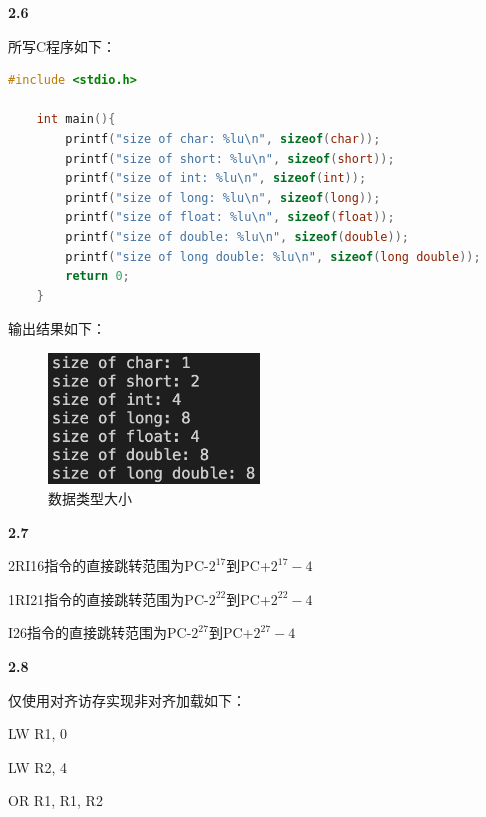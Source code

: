 \documentclass[UTF8]{article}
\newcommand{\tbf}[1]{\textbf{#1}}
\begin{document}
\tbf{2.6}

所写C程序如下：

\begin{lstlisting}[language=C]
    #include <stdio.h>

    int main(){
        printf("size of char: %lu\n", sizeof(char));
        printf("size of short: %lu\n", sizeof(short));
        printf("size of int: %lu\n", sizeof(int));
        printf("size of long: %lu\n", sizeof(long));
        printf("size of float: %lu\n", sizeof(float));
        printf("size of double: %lu\n", sizeof(double));
        printf("size of long double: %lu\n", sizeof(long double));
        return 0;
    }
\end{lstlisting}

输出结果如下：

\begin{figure}[H]
    \centering
    \includegraphics[width=0.5\textwidth]{hw2_6.png}
    \caption{数据类型大小}
\end{figure}

\tbf{2.7}

2RI16指令的直接跳转范围为PC-$2^{17}$到PC+$2^{17}-4$

1RI21指令的直接跳转范围为PC-$2^{22}$到PC+$2^{22}-4$

I26指令的直接跳转范围为PC-$2^{27}$到PC+$2^{27}-4$

\tbf{2.8}

仅使用对齐访存实现非对齐加载如下：

LW R1, 0

LW R2, 4 

OR R1, R1, R2
\end{document}
